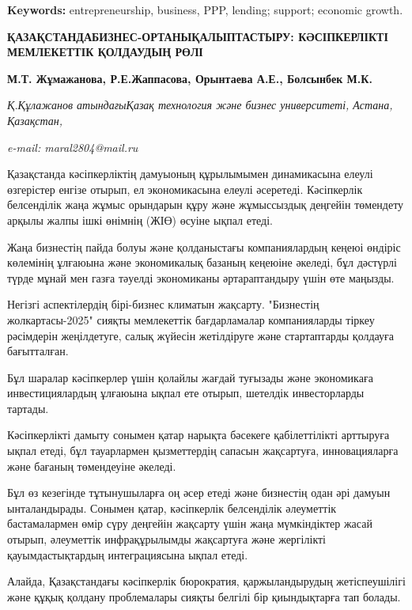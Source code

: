 {\bfseries Keywords:} entrepreneurship, business, PPP, lending; support;
economic growth.

\begin{articleheader}
{\bfseries ҚАЗАҚСТАНДАБИЗНЕС-ОРТАНЫҚАЛЫПТАСТЫРУ: КӘСІПКЕРЛІКТІ МЕМЛЕКЕТТІК
ҚОЛДАУДЫҢ РӨЛІ}

{\bfseries М.Т. Жұмажанова\textsuperscript{\envelope }, Р.Е.Жаппасова, Орынтаева
А.Е., Болсынбек М.К.}
\end{articleheader}

\begin{affiliation}
\emph{Қ.Құлажанов атындағыҚазақ технология және бизнес университеті,
Астана, Қазақстан,}

\emph{e-mail: maral2804@mail.ru}
\end{affiliation}

Қазақстанда кәсіпкерліктің дамуыоның құрылымымен динамикасына елеулі
өзгерістер енгізе отырып, ел экономикасына елеулі әсеретеді. Кәсіпкерлік
белсенділік жаңа жұмыс орындарын құру және жұмыссыздық деңгейін
төмендету арқылы жалпы ішкі өнімнің (ЖІӨ) өсуіне ықпал етеді.

Жаңа бизнестің пайда болуы және қолданыстағы компаниялардың кеңеюі
өндіріс көлемінің ұлғаюына және экономикалық базаның кеңеюіне әкеледі,
бұл дәстүрлі түрде мұнай мен газға тәуелді экономиканы әртараптандыру
үшін өте маңызды.

Негізгі аспектілердің бірі-бизнес климатын жақсарту. "Бизнестің
жолкартасы-2025" сияқты мемлекеттік бағдарламалар компанияларды тіркеу
рәсімдерін жеңілдетуге, салық жүйесін жетілдіруге және стартаптарды
қолдауға бағытталған.

Бұл шаралар кәсіпкерлер үшін қолайлы жағдай туғызады және экономикаға
инвестициялардың ұлғаюына ықпал ете отырып, шетелдік инвесторларды
тартады.

Кәсіпкерлікті дамыту сонымен қатар нарықта бәсекеге қабілеттілікті
арттыруға ықпал етеді, бұл тауарлармен қызметтердің сапасын жақсартуға,
инновацияларға және бағаның төмендеуіне әкеледі.

Бұл өз кезегінде тұтынушыларға оң әсер етеді және бизнестің одан әрі
дамуын ынталандырады. Сонымен қатар, кәсіпкерлік белсенділік әлеуметтік
бастамалармен өмір сүру деңгейін жақсарту үшін жаңа мүмкіндіктер жасай
отырып, әлеуметтік инфрақұрылымды жақсартуға және жергілікті
қауымдастықтардың интеграциясына ықпал етеді.

Алайда, Қазақстандағы кәсіпкерлік бюрократия, қаржыландырудың
жетіспеушілігі және құқық қолдану проблемалары сияқты белгілі бір
қиындықтарға тап болады.

